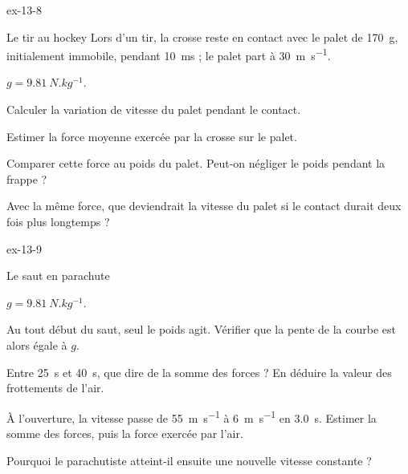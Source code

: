 \begin{blocLivre}{ex-13-8}
\begin{exercice}[2]{Le tir au hockey}
Lors d'un tir, la crosse reste en contact avec le palet de \qty{170}{g}, initialement immobile, pendant \qty{10}{ms} ; le palet part à \qty{30}{m.s^{-1}}.
\begin{donnees}
$g=\qty{9,81}{N.kg^{-1}}$.
\end{donnees}
\begin{questions}
\item Calculer la variation de vitesse du palet pendant le contact.
\item Estimer la force moyenne exercée par la crosse sur le palet.
\item Comparer cette force au poids du palet. Peut-on négliger le poids pendant la frappe ?
\item Avec la même force, que deviendrait la vitesse du palet si le contact durait deux fois plus longtemps ?
\end{questions}
\end{exercice}
\end{blocLivre}
\begin{blocLivre}{ex-13-9}
\begin{exercice}[2]{Le saut en parachute}
\begin{donnees}
$g=\qty{9,81}{N.kg^{-1}}$.
\end{donnees}
\begin{questions}
\item Au tout début du saut, seul le poids agit. Vérifier que la pente de la courbe est alors égale à $g$.
\item Entre \qty{25}{s} et \qty{40}{s}, que dire de la somme des forces ? En déduire la valeur des frottements de l'air.
\item À l'ouverture, la vitesse passe de \qty{55}{m.s^{-1}} à \qty{6}{m.s^{-1}} en \qty{3,0}{s}. Estimer la somme des forces, puis la force exercée par l'air.
\item Pourquoi le parachutiste atteint-il ensuite une nouvelle vitesse constante ?
\end{questions}
\end{exercice}
\end{blocLivre}
